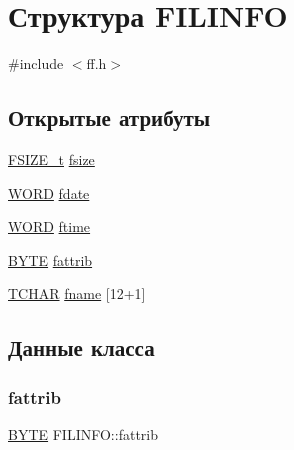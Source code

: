 \hypertarget{struct_f_i_l_i_n_f_o}{}\section{Структура F\+I\+L\+I\+N\+FO}
\label{struct_f_i_l_i_n_f_o}


{\ttfamily \#include $<$ff.\+h$>$}

\subsection*{Открытые атрибуты}
\begin{DoxyCompactItemize}
\item 
\mbox{\hyperlink{ff_8h_a3fc0992ad7436250b6b1a0592214b7f2}{F\+S\+I\+Z\+E\+\_\+t}} \mbox{\hyperlink{struct_f_i_l_i_n_f_o_a9e5b78ed7190f73de3ebcbdfbd6d1844}{fsize}}
\item 
\mbox{\hyperlink{ff_8h_a197942eefa7db30960ae396d68339b97}{W\+O\+RD}} \mbox{\hyperlink{struct_f_i_l_i_n_f_o_a7c01c48a15b1b49da459924437b0bd52}{fdate}}
\item 
\mbox{\hyperlink{ff_8h_a197942eefa7db30960ae396d68339b97}{W\+O\+RD}} \mbox{\hyperlink{struct_f_i_l_i_n_f_o_ae0f751b79621bf7b29669f177bbe6b9a}{ftime}}
\item 
\mbox{\hyperlink{ff_8h_a4ae1dab0fb4b072a66584546209e7d58}{B\+Y\+TE}} \mbox{\hyperlink{struct_f_i_l_i_n_f_o_a838d542585831b085537b363f18205c0}{fattrib}}
\item 
\mbox{\hyperlink{ff_8h_a03bdb8ce5895c7e261aadc2529637546}{T\+C\+H\+AR}} \mbox{\hyperlink{struct_f_i_l_i_n_f_o_ac06b247cfb3b708c76413c436e52fa7e}{fname}} \mbox{[}12+1\mbox{]}
\end{DoxyCompactItemize}


\subsection{Данные класса}
\mbox{\label{struct_f_i_l_i_n_f_o_a838d542585831b085537b363f18205c0}} 
\subsubsection{\texorpdfstring{fattrib}{fattrib}}
{\footnotesize\ttfamily \mbox{\hyperlink{ff_8h_a4ae1dab0fb4b072a66584546209e7d58}{B\+Y\+TE}} F\+I\+L\+I\+N\+F\+O\+::fattrib}

\mbox{\label{struct_f_i_l_i_n_f_o_a7c01c48a15b1b49da459924437b0bd52}} 
